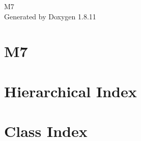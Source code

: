 \documentclass[twoside]{book}
\newcommand{\+}{\discretionary{\mbox{\scriptsize$\hookleftarrow$}}{}{}}
\newcommand{\clearemptydoublepage}{%
  \newpage{\pagestyle{empty}\cleardoublepage}%
}
\begin{document}
\hypersetup{pageanchor=false,
             bookmarksnumbered=true,
             pdfencoding=unicode
            }
\begin{titlepage}
\vspace*{7cm}
\begin{center}%
{\Large M7 }\\
\vspace*{1cm}
{\large Generated by Doxygen 1.8.11}\\
\end{center}
\end{titlepage}
\clearemptydoublepage
\tableofcontents
\clearemptydoublepage
{}
\hypersetup{pageanchor=true}

\chapter{M7}
\label{index}\hypertarget{index}{}
\chapter{Hierarchical Index}

\chapter{Class Index}

\end{document}
